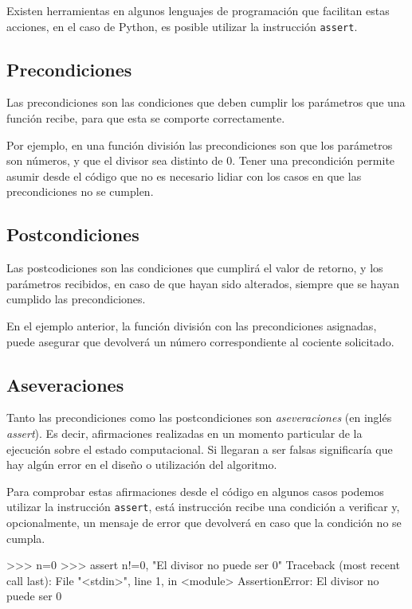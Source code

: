 Existen herramientas en algunos lenguajes de programación que facilitan estas
acciones, en el caso de Python, es posible utilizar la instrucción
\lstinline!assert!.

\subsection{Precondiciones}

Las precondiciones son las condiciones que deben cumplir los parámetros que
una función recibe, para que esta se comporte correctamente.

Por ejemplo, en una función división las precondiciones son que los parámetros
son números, y que el divisor sea distinto de 0. Tener una precondición
permite asumir desde el código que no es necesario lidiar con los casos en que
las precondiciones no se cumplen.

\subsection{Postcondiciones}

Las postcodiciones son las condiciones que cumplirá el valor de retorno, y
los parámetros recibidos, en caso de que hayan sido alterados,
siempre que se hayan cumplido las precondiciones.

En el ejemplo anterior, la función división con las precondiciones asignadas,
puede asegurar que devolverá un número correspondiente al cociente solicitado.

\subsection{Aseveraciones}

Tanto las precondiciones como las postcondiciones son \textit{aseveraciones}
(en inglés \textit{assert}). Es decir, afirmaciones realizadas en un momento
particular de la ejecución sobre el estado computacional. Si llegaran a ser
falsas significaría que hay algún error en el diseño o utilización del algoritmo.

Para comprobar estas afirmaciones desde el código en algunos casos podemos
utilizar la instrucción \lstinline!assert!, está instrucción recibe una
condición a verificar y, opcionalmente, un mensaje de error que devolverá en
caso que la condición no se cumpla.

\begin{codigo-python-sn}
>>> n=0
>>> assert n!=0, "El divisor no puede ser 0"
Traceback (most recent call last):
  File "<stdin>", line 1, in <module>
AssertionError: El divisor no puede ser 0
\end{codigo-python-sn}

